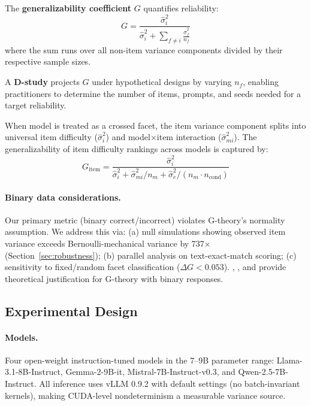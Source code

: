 \documentclass[letterpaper]{article}
\begin{document}
The \textbf{generalizability coefficient} $G$ quantifies reliability:
\begin{equation}
G = \frac{\hat{\sigma}^2_i}{\hat{\sigma}^2_i + \sum_{f \neq i} \frac{\hat{\sigma}^2_f}{n_f}}
\end{equation}
where the sum runs over all non-item variance components divided by their respective sample sizes.

A \textbf{D-study} projects $G$ under hypothetical designs by varying $n_f$, enabling practitioners to determine the number of items, prompts, and seeds needed for a target reliability.

When model is treated as a crossed facet, the item variance component splits into universal item difficulty ($\hat{\sigma}^2_i$) and model$\times$item interaction ($\hat{\sigma}^2_{mi}$).
The generalizability of item difficulty rankings across models is captured by:
\begin{equation}
G_{\text{item}} = \frac{\hat{\sigma}^2_i}{\hat{\sigma}^2_i + \hat{\sigma}^2_{mi} / n_m + \hat{\sigma}^2_{e} / (n_m \cdot n_{\text{cond}})}
\end{equation}

\paragraph{Binary data considerations.}
Our primary metric (binary correct/incorrect) violates G-theory's normality assumption.
We address this via: (a) null simulations showing observed item variance exceeds Bernoulli-mechanical variance by 737$\times$ (Section~\ref{sec:robustness}); (b) parallel analysis on text-exact-match scoring; (c) sensitivity to fixed/random facet classification ($\Delta G < 0.053$).
\citet{shavelson1989generalizability}, \citet{mushquash2006generalizability}, and \citet{jiang2017generalized} provide theoretical justification for G-theory with binary responses.

\subsection{Experimental Design}

\paragraph{Models.}
Four open-weight instruction-tuned models in the 7--9B parameter range: Llama-3.1-8B-Instruct, Gemma-2-9B-it, Mistral-7B-Instruct-v0.3, and Qwen-2.5-7B-Instruct.
All inference uses vLLM 0.9.2 with default settings (no batch-invariant kernels), making CUDA-level nondeterminism a measurable variance source.
\end{document}
